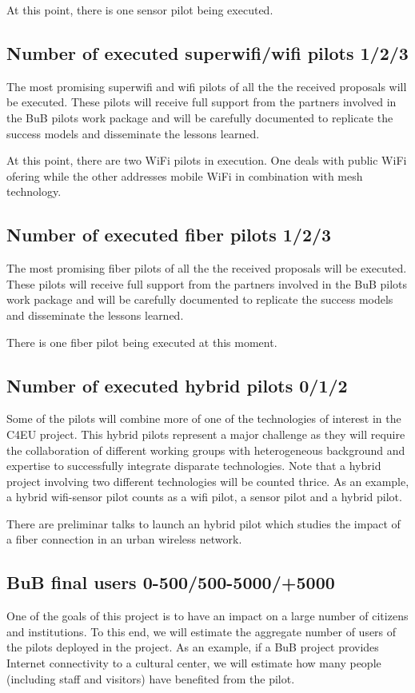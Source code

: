 \documentclass[draftclsnofoot,12pt,journal,onecolumn]{IEEEtran}
\begin{document}
At this point, there is one sensor pilot being executed.

\subsection{Number of executed superwifi/wifi pilots 1/2/3}
The most promising superwifi and wifi pilots of all the the received
proposals will be executed. These pilots will receive full support
from the partners involved in the BuB pilots work package and will be
carefully documented to replicate the success models and disseminate
the lessons learned.

At this point, there are two WiFi pilots in execution.
One deals with public WiFi ofering while the other addresses mobile WiFi in combination with mesh technology.

\subsection{Number of executed fiber pilots 1/2/3}
The most promising fiber pilots of all the the received proposals will
be executed. These pilots will receive full support from the partners
involved in the BuB pilots work package and will be carefully
documented to replicate the success models and disseminate the lessons
learned.

There is one fiber pilot being executed at this moment.

\subsection{ Number of executed hybrid pilots 0/1/2}
Some of the pilots will combine more of one of the technologies of
interest in the C4EU project. This hybrid pilots represent a major
challenge as they will require the collaboration of different working
groups with heterogeneous background and expertise to successfully
integrate disparate technologies. Note that a hybrid project involving
two different technologies will be counted thrice. As an example, a
hybrid wifi-sensor pilot counts as a wifi pilot, a sensor pilot and a
hybrid pilot.

There are preliminar talks to launch an hybrid pilot which studies the impact of a fiber connection in an urban wireless network.

\subsection{BuB final users 0-500/500-5000/+5000}
One of the goals of this project is to have an impact on a large
number of citizens and institutions. To this end, we will estimate the
aggregate number of users of the pilots deployed in the project. As an
example, if a BuB project provides Internet connectivity to a cultural
center, we will estimate how many people (including staff and
visitors) have benefited from the pilot.
\end{document}
